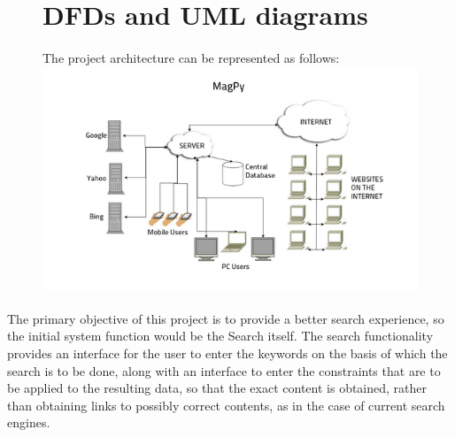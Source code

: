 \documentclass[a4paper]{report}
\begin{document}
\begin{figure}
\section{DFDs and UML diagrams}
\paragraph{}
\large\textnormal{The project architecture can be represented as follows:}
\vspace{.3cm}
\center
\includegraphics[width=6in]{architecture.png} 
\vspace{.3cm}
\end{figure}

\paragraph{}
\large\textnormal{The primary objective of this project is to provide a better search experience, so the initial system function would be the Search itself. The search functionality provides an interface for the user to enter the keywords on the basis of which the search is to be done, along with an interface to enter the constraints that are to be applied to the resulting data, so that the exact content is obtained, rather than obtaining links to possibly correct contents, as in the case of current search engines.} 
\end{document}
